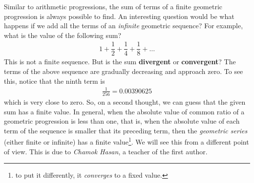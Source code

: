 \documentclass{subfile}
\begin{document}
	Similar to arithmetic progressions, the sum of terms of a finite geometric progression is always possible to find. An interesting question would be what happens if we add all the terms of an \textit{infinite} geometric sequence? For example, what is the value of the following sum?
		\begin{align*}
			1 + \dfrac{1}{2}+ \dfrac{1}{4}+\dfrac{1}{8}+ \ldots
		\end{align*}
	This is not a finite sequence. But is the sum \textbf{divergent} or \textbf{convergent}? The terms of the above sequence are gradually decreasing and approach zero. To see this, notice that the ninth term is
		\begin{align*}
			\frac{1}{256} = 0.00390625
		\end{align*}
	which is very close to zero. So, on a second thought, we can guess that the given sum has a finite value. In general, when the absolute value of common ratio of a geometric progression is less than one, that is, when the absolute value of each term of the sequence is smaller that its preceding term, then the \textit{geometric series} (either finite or infinite) has a finite value\footnote{to put it differently, it \textit{converges} to a fixed value.}. We will see this from a different point of view. This is due to \textit{Chamok Hasan}, a teacher of the first author.
\end{document}
